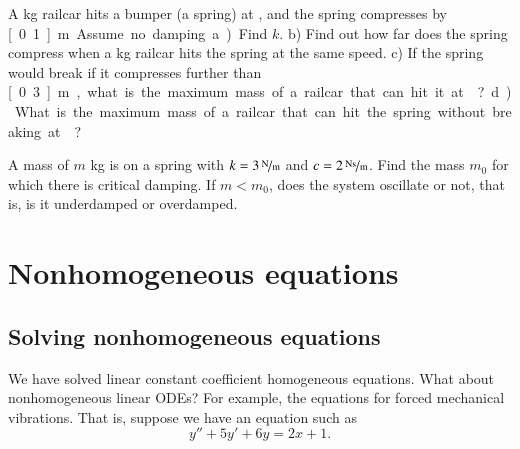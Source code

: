 \documentclass[12pt]{book}
\begin{document}
\begin{exercise}
A \unit[5000]{kg} railcar hits a bumper (a spring) at ,
and the spring compresses by \unit[0.1]{m}.  Assume no damping.
a) Find $k$. b) Find out how far does the spring compress when a
\unit[10000]{kg} railcar hits the spring at the same speed. c) If the spring
would break if it compresses further than \unit[0.3]{m}, what is the maximum
mass of a railcar that can hit it at ? d) What is
the maximum mass of a railcar that can hit the spring without breaking
at ?
\end{exercise}

\begin{exercise}
A mass of $m$ \unit{kg} is on a spring with $k=\unitfrac[3]{N}{m}$ and
$c=\unitfrac[2]{Ns}{m}$.  Find the mass $m_0$ for which there is critical
damping.  If $m < m_0$, does the system oscillate or not, that is, is it
underdamped or overdamped.
\end{exercise}


\sectionnewpage
\section{Nonhomogeneous equations}
\label{sec:nonhom}


\subsection{Solving nonhomogeneous equations}

We have solved linear constant coefficient homogeneous 
equations.
What about nonhomogeneous linear ODEs?
For example, the equations for forced mechanical vibrations.
That is, suppose we have an equation such as
\begin{equation} \label{eq3.5:nh}
y'' + 5y'+ 6y = 2x+1 .
\end{equation}
\end{document}
